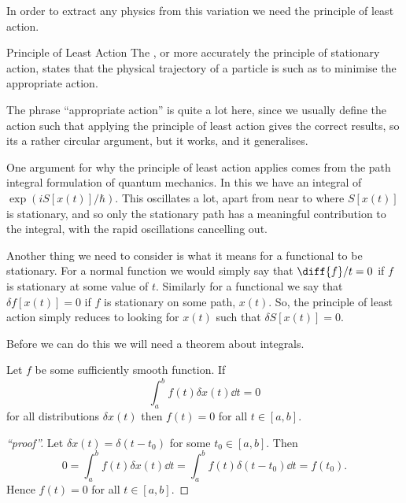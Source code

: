 In order to extract any physics from this variation we need the principle of least action.

\begin{clm}{Principle of Least Action}{}
    The , or more accurately the principle of stationary action, states that the physical trajectory of a particle is such as to minimise the appropriate action.
\end{clm}
The phrase \enquote{appropriate action} is quite a lot here, since we usually define the action such that applying the principle of least action gives the correct results, so its a rather circular argument, but it works, and it generalises.

One argument for why the principle of least action applies comes from the path integral formulation of quantum mechanics.
In this we have an integral of \(\exp(i S[x(t)]/\hbar)\).
This oscillates a lot, apart from near to where \(S[x(t)]\) is stationary, and so only the stationary path has a meaningful contribution to the integral, with the rapid oscillations cancelling out.

Another thing we need to consider is what it means for a functional to be stationary.
For a normal function we would simply say that \(\diff{f}/{t} = 0\) if \(f\) is stationary at some value of \(t\).
Similarly for a functional we say that \(\delta f[x(t)] = 0\) if \(f\) is stationary on some path, \(x(t)\).
So, the principle of least action simply reduces to looking for \(x(t)\) such that \(\delta S[x(t)] = 0\).

Before we can do this we will need a theorem about integrals.

\begin{thm}{}{}
    Let \(f\) be some sufficiently smooth function.
    If
    \begin{equation}
        \int_a^b f(t) \delta x(t) \dd{t} = 0
    \end{equation}
    for all distributions \(\delta x(t)\) then \(f(t) = 0\) for all \(t \in [a, b]\).
    
    \begin{proof}[\enquote{proof}]
        Let \(\delta x(t) = \delta(t - t_0)\) for some \(t_0 \in [a, b]\).
        Then
        \begin{equation}
            0 = \int_a^b f(t) \delta x(t) \dd{t} = \int_a^b f(t) \delta(t - t_0) \dd{t} = f(t_0).
        \end{equation}
        Hence \(f(t) = 0\) for all \(t \in [a, b]\).
    \end{proof}
\end{thm}

